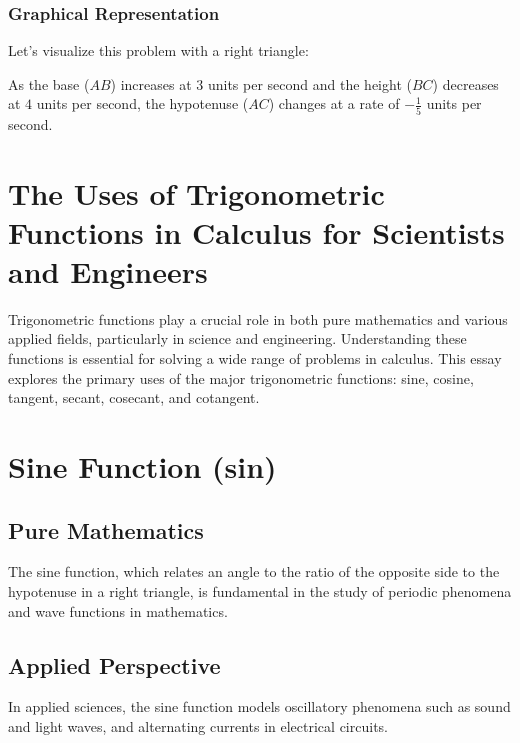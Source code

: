\documentclass[a4paper,12pt]{book}
\newcounter{problem}
\begin{document}
\subsubsection{Graphical Representation}

Let's visualize this problem with a right triangle:

\begin{center}
\end{center}

As the base (\(AB\)) increases at \(3\) units per second and the height (\(BC\)) decreases at \(4\) units per second, the hypotenuse (\(AC\)) changes at a rate of \(-\frac{1}{5}\) units per second.


\section{The Uses of Trigonometric Functions in Calculus for Scientists and Engineers}
Trigonometric functions play a crucial role in both pure mathematics and various applied fields, particularly in science and engineering. Understanding these functions is essential for solving a wide range of problems in calculus. This essay explores the primary uses of the major trigonometric functions: sine, cosine, tangent, secant, cosecant, and cotangent.

\section*{Sine Function (sin)}
\subsection*{Pure Mathematics}
The sine function, which relates an angle to the ratio of the opposite side to the hypotenuse in a right triangle, is fundamental in the study of periodic phenomena and wave functions in mathematics.

\subsection*{Applied Perspective}
In applied sciences, the sine function models oscillatory phenomena such as sound and light waves, and alternating currents in electrical circuits.
\end{document}
